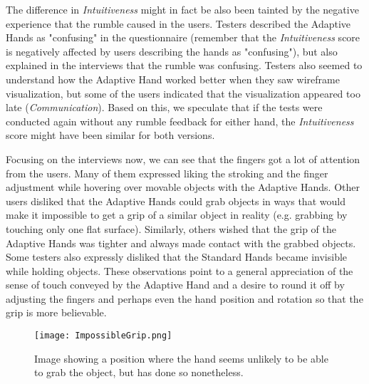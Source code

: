 The difference in \textit{Intuitiveness} might in fact be also been tainted by the negative experience that the rumble caused in the users. Testers described the Adaptive Hands as "confusing" in the questionnaire (remember that the \textit{Intuitiveness} score is negatively affected by users describing the hands as "confusing"), but also explained in the interviews that the rumble was confusing. Testers also seemed to understand how the Adaptive Hand worked better when they saw wireframe visualization, but some of the users indicated that the visualization appeared too late (\textit{Communication}). Based on this, we speculate that if the tests were conducted again without any rumble feedback for either hand, the \textit{Intuitiveness} score might have been similar for both versions. 

Focusing on the interviews now, we can see that the fingers got a lot of attention from the users. Many of them expressed liking the stroking and the finger adjustment while hovering over movable objects with the Adaptive Hands. Other users disliked that the Adaptive Hands could grab objects in ways that would make it impossible to get a grip of a similar object in reality (e.g. grabbing by touching only one flat surface). Similarly, others wished that the grip of the Adaptive Hands was tighter and always made contact with the grabbed objects. Some testers also expressly disliked that the Standard Hands became invisible while holding objects. These observations point to a general appreciation of the sense of touch conveyed by the Adaptive Hand and a desire to round it off by adjusting the fingers and perhaps even the hand position and rotation so that the grip is more believable.

\begin{figure}[h]
\centering
\texttt{[image: ImpossibleGrip.png]}
\caption{Image showing a position where the hand seems unlikely to be able to grab the object, but has done so nonetheless.}
\label{fig:impossibleGrip}
\end{figure}

